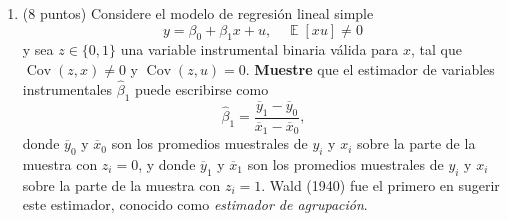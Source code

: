 \documentclass[letterpaper,11pt]{article}
\DeclareMathOperator{\var}{Var}
\DeclareMathOperator{\cov}{Cov}
\DeclareMathOperator{\Exp}{\mathbb{E}}
\newcommand{\E}[1]{\Exp\left[#1\right]}
\DeclareMathOperator{\plim}{plim}
\newcommand{\respuesta}{\color{blue}\paragraph{Respuesta.}}
\newcommand{\fin}{\color{black}}
\begin{document}
\begin{enumerate}
\begin{enumerate}
\begin{enumerate}[(i)]
            \end{enumerate}

    \respuesta \textbf{Falso.} Basta un contra-ejemplo:
    \begin{itemize}
        \item \emph{Estimador de variables instrumentales.} Por los resultados
        dados,
        \[
            \plim\widehat\beta_1
            =\frac{\cov(z,y)}{\cov(z,x)}
            =\frac{\beta_1\cov(z,x)+\cov(z,u)}{\cov(z,x)}=\beta_1,
        \]
        pues $\cov(z,u)=0$; es consistente. Pero en muestra finita
        $\E{\widehat\beta_1}\neq\beta_1$, porque la esperanza de un cociente no
        es el cociente de las esperanzas: $\E{A/B}\neq\E{A}/\E{B}$. Es
        consistente y sesgado.
        \item \emph{Estimador $\widehat\sigma$.} Como $\plim\widehat\sigma^2=\sigma^2$,
        por continuidad de la raíz cuadrada $\plim\widehat\sigma=\sigma$. Pero,
        por la desigualdad de Jensen (la raíz es cóncava),
        \[
            \E{\widehat\sigma}<\sqrt{\E{\widehat\sigma^2}}=\sigma,
        \]
        es decir, es consistente pero sesgado a la baja.
    \end{itemize}
    \fin

        \item\color{black}  (4 puntos) Todo estimador insesgado es necesariamente consistente.
            
            \medskip
            \textit{Hint:}
                Piense en el estimador $\widehat \mu = y_1$ para la media poblacional $\mu = \E{y}$ de la variable aleatoria $y$, donde $y_1$ es la primera observación de la muestra i.i.d. $\lbrace y_i \rbrace_{i=1}^n$.

    \respuesta \textbf{Falso.} Sea $\widehat\mu=y_1$. Es insesgado, pues
    $\E{y_1}=\mu$. Sin embargo $\var(y_1)=\sigma^2$ no depende de $n$ ni tiende
    a cero, por lo que la distribución de $\widehat\mu$ no se concentra en
    $\mu$ cuando $n\to\infty$: no es consistente.
    \fin
    
    \end{enumerate}

    \item\color{black}  (8 puntos) Considere el modelo de regresión lineal simple
        $$y=\beta_0+\beta_1x+u,\quad\E{x u}\neq0
        $$
        y sea $z \in \lbrace 0, 1 \rbrace$ una variable instrumental binaria válida para $x$, tal que $\cov{\left( z, x \right)} \neq 0$ y $\cov{\left( z, u \right)} = 0$.
        \textbf{Muestre} que el estimador de variables instrumentales $\widehat \beta_1$ puede escribirse como
        $$\widehat \beta_1=\frac{\overline y_1 -        \overline y_0}{\overline x_1 - \overline x_0}\text{,}$$
        donde $\overline y_0$ y $\overline x_0$ son los promedios muestrales de $y_i$ y $x_i$ sobre la parte de la muestra con $z_i = 0$, y donde $\overline y_1$ y $\overline x_1$ son los promedios muestrales de $y_i$ y $x_i$ sobre la parte de la muestra con $z_i = 1$. 
        Wald (1940) fue el primero en sugerir este estimador, conocido como \textit{estimador de agrupación}.
        

\end{enumerate}
\end{document}
